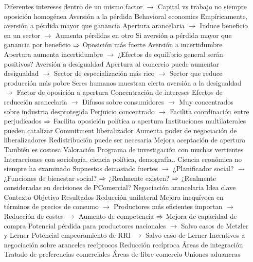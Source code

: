 \documentclass{nuevotema}
\begin{document}
\begin{esquemal}
				\4[] Diferentes intereses dentro de un mismo factor
				\4[] $\to$ Capital vs trabajo no siempre oposición homogénea
			\3 Aversión a la pérdida
				\4 Behavioral economics
				\4[] Empíricamente, aversión a pérdida mayor que ganancia
				\4 Apertura arancelaria
				\4[] $\to$ Induce beneficio en un sector
				\4[] $\to$ Aumenta pérdidas en otro
				\4 Si aversión a pérdida mayor que ganancia por beneficio
				\4[] $\then$ Oposición más fuerte
			\3 Aversión a incertidumbre
				\4 Apertura aumenta incertidumbre
				\4[] $\to$ ¿Efectos de equilibrio general serán positivos?
			\3 Aversión a desigualdad
				\4 Apertura al comercio puede aumentar desigualdad
				\4[] $\to$ Sector de especialización más rico
				\4[] $\to$ Sector que reduce producción más pobre
				\4 Seres humanos muestran cierta aversión a la desigualdad
				\4[] $\to$ Factor de oposición a apertura
			\3 Concentración de intereses
				\4 Efectos de reducción arancelaria
				\4[] $\to$ Difusos sobre consumidores
				\4[] $\to$ Muy concentrados sobre industria desprotegida
				\4 Perjuicio concentrado
				\4[] $\to$ Facilita coordinación entre perjudicados
				\4[] $\then$ Facilita oposición política a apertura
			\3 Instituciones multilaterales pueden catalizar
				\4 Commitment liberalizador
				\4[] Aumenta poder de negociación de liberalizadores
			\3 Redistribución puede ser necesaria
				\4 Mejora aceptación de apertura
				\4[] También es costosa
			\3 Valoración
				\4 Programa de investigación con muchas vertientes
				\4 Interacciones con sociología, ciencia política, demografía..
				\4 Ciencia económica no siempre ha examinado
				\4[] Supuestos demasiado fuertes
				\4[] $\to$ ¿Planificador social?
				\4[] $\to$ ¿Funciones de bienestar social?
				\4[] $\then$ ¿Realmente existen?
				\4[] $\then$ ¿Realmente consideradas en decisiones de PComercial?
		\2 Negociación arancelaria
			\3 Idea clave
				\4 Contexto
				\4[]
				\4 Objetivo
				\4 Resultados
			\3 Reducción unilateral
				\4 Mejora inequívoca en términos de precios de consumo
				\4[] $\to$ Productores más eficientes importan
				\4[] $\to$ Reducción de costes
				\4[] $\to$ Aumento de competencia
				\4[] $\then$ Mejora de capacidad de compra
				\4 Potencial pérdida para productores nacionales
				\4[] $\to$ Salvo casos de Metzler y Lerner
				\4 Potencial empeoramiento de RRI
				\4[] $\to$ Salvo caso de Lerner
				\4[$\then$] Incentivos a negociación sobre aranceles recíprocos
			\3 Reducción recíproca
				\4 Áreas de integración
				\4[] Tratado de preferencias comerciales
				\4[] Áreas de libre comercio
				\4[] Uniones aduaneras

\end{esquemal}
\end{document}
